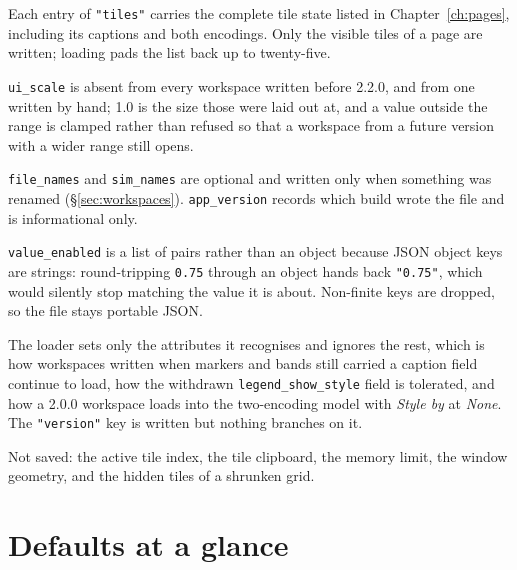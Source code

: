 \documentclass[11pt,a4paper,oneside]{report}
\newcommand{\appver}{2.2.0}
\newcommand{\code}[1]{\texttt{#1}}
\begin{document}
Each entry of \code{"tiles"} carries the complete tile state listed in
Chapter~\ref{ch:pages}, including its captions and both encodings. Only the
visible tiles of a page are written; loading pads the list back up to
twenty-five.

\code{ui\_scale} is absent from every workspace written before \appver{}, and
from one written by hand; 1.0 is the size those were laid out at, and a value
outside the range is clamped rather than refused so that a workspace from a
future version with a wider range still opens.

\code{file\_names} and \code{sim\_names} are optional and written only when
something was renamed (\S\ref{sec:workspaces}). \code{app\_version} records
which build wrote the file and is informational only.

\code{value\_enabled} is a list of pairs rather than an object because JSON
object keys are strings: round-tripping \code{0.75} through an object hands back
\code{"0.75"}, which would silently stop matching the value it is about.
Non-finite keys are dropped, so the file stays portable JSON.

The loader sets only the attributes it recognises and ignores the rest, which is
how workspaces written when markers and bands still carried a caption field
continue to load, how the withdrawn \code{legend\_show\_style} field is
tolerated, and how a 2.0.0 workspace loads into the two-encoding model with
\emph{Style by} at \emph{None}. The \code{"version"} key is written but nothing
branches on it.

Not saved: the active tile index, the tile clipboard, the memory limit, the
window geometry, and the hidden tiles of a shrunken grid.

\chapter{Defaults at a glance}
\end{document}
